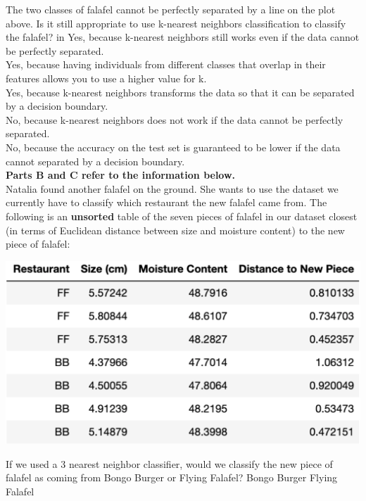 \begin{enumerate}
 The two classes of falafel cannot be perfectly separated by a line on the plot above. Is it still appropriate to use k-nearest neighbors classification to classify the falafel?
     in
    \solutionbubble \quad Yes, because k-nearest neighbors still works even if the data cannot be perfectly separated. \\[4pt]
    \bubble \quad Yes, because having individuals from different classes that overlap in their features allows you to use a higher value for k. \\[4pt]
    \bubble \quad Yes, because k-nearest neighbors transforms the data so that it can be separated by a decision boundary. \\[4pt]
    \bubble \quad No, because k-nearest neighbors does not work if the data cannot be perfectly separated. \\[4pt]
    \bubble \quad No, because the accuracy on the test set is guaranteed to be lower if the data cannot separated by a decision boundary. \\[4pt]

\clearpage
\textbf{Parts B and C refer to the information below.} \\
Natalia found another falafel on the ground. She wants to use the dataset we currently have to classify which restaurant the new falafel came from.  The following is an \textbf{unsorted } table of the seven pieces of falafel in our dataset closest (in terms of Euclidean distance between size and moisture content)  to the new piece of falafel:
\begin{center}
\includegraphics[scale=.34]{figures/falafel_nn.png}
\end{center}
\vskip0.1in
 If we used a 3 nearest neighbor classifier, would we classify the new piece of falafel as coming from Bongo Burger or Flying Falafel?
\hspace{0.25in}\solutionbubble Bongo Burger\hspace{0.25in} \bubble Flying Falafel


\end{enumerate}
